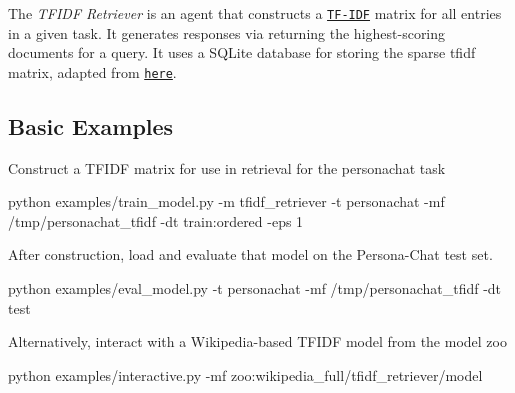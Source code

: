 The {\itshape T\+F\+I\+DF Retriever} is an agent that constructs a \href{https://en.wikipedia.org/wiki/Tf%E2%80%93idf}{\tt T\+F-\/\+I\+DF} matrix for all entries in a given task. It generates responses via returning the highest-\/scoring documents for a query. It uses a S\+Q\+Lite database for storing the sparse tfidf matrix, adapted from \href{http://github.com/facebookresearch/DrQA/}{\tt here}.

\subsection*{Basic Examples}

Construct a T\+F\+I\+DF matrix for use in retrieval for the personachat task 
\begin{DoxyCode}
python examples/train\_model.py -m tfidf\_retriever -t personachat -mf /tmp/personachat\_tfidf -dt
       train:ordered -eps 1
\end{DoxyCode}
 After construction, load and evaluate that model on the Persona-\/\+Chat test set. 
\begin{DoxyCode}
python examples/eval\_model.py -t personachat -mf /tmp/personachat\_tfidf -dt test
\end{DoxyCode}


Alternatively, interact with a Wikipedia-\/based T\+F\+I\+DF model from the model zoo 
\begin{DoxyCode}
python examples/interactive.py -mf zoo:wikipedia\_full/tfidf\_retriever/model
\end{DoxyCode}
 